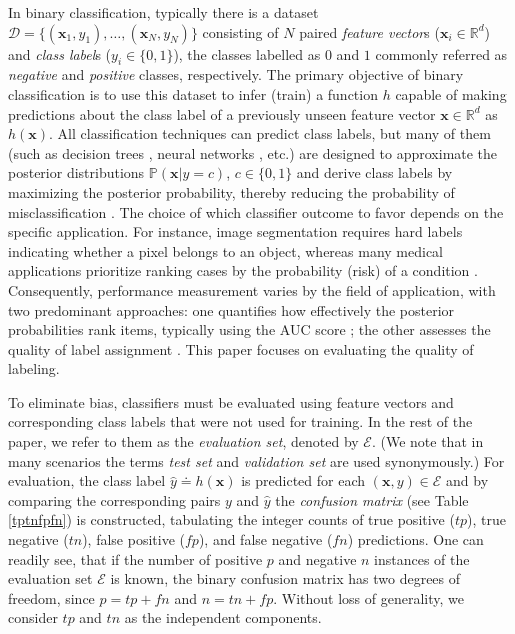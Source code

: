 \documentclass[3p, times]{elsarticle}
\begin{document}
In binary classification, typically there is a dataset $\mathcal{D} = \lbrace(\mathbf{x}_1, y_1), \dots, (\mathbf{x}_N, y_N)\rbrace$ consisting of $N$ paired \emph{feature vector}s ($\mathbf{x}_i\in\mathbb{R}^{d}$) and \emph{class label}s ($y_i\in\lbrace 0, 1\rbrace$), the classes labelled as $0$ and $1$ commonly referred as \emph{negative} and \emph{positive} classes, respectively.
The primary objective of binary classification is to use this dataset to infer (train) a function $h$ capable of making predictions about the class label of a previously unseen feature vector $\mathbf{x}\in\mathbb{R}^d$ as $h(\mathbf{x})$. All classification techniques can predict class labels, but many of them (such as decision trees \cite{mlbook}, neural networks \cite{mlbook}, etc.) are designed to approximate the posterior distributions $\mathbb{P}(\mathbf{x}|y=c)$, $c\in\lbrace 0, 1\rbrace$ and derive class labels by maximizing the posterior probability, thereby reducing the probability of misclassification \cite{bayesclassifier}. The choice of which classifier outcome to favor depends on the specific application. For instance, image segmentation \cite{segmentation} requires hard labels indicating whether a pixel belongs to an object, whereas many medical applications prioritize ranking cases by the probability (risk) of a condition \cite{binclasranking}. Consequently, performance measurement varies by the field of application, with two predominant approaches: one quantifies how effectively the posterior probabilities rank items, typically using the AUC score \cite{aucsurvey, auc}; the other assesses the quality of label assignment \cite{scores}. This paper focuses on evaluating the quality of labeling.

To eliminate bias, classifiers must be evaluated using feature vectors and corresponding class labels that were not used for training. In the rest of the paper, we refer to them as the \emph{evaluation set}, denoted by $\mathcal{E}$. (We note that in many scenarios the terms \emph{test set} and \emph{validation set} are used synonymously.) For evaluation, the class label $\hat{y} \doteq h(\mathbf{x})$ is predicted for each $(\mathbf{x}, y)\in\mathcal{E}$ and by comparing the corresponding pairs $y$ and $\hat{y}$ the \emph{confusion matrix} (see Table \ref{tptnfpfn}) is constructed, tabulating the integer counts of true positive ($tp$), true negative ($tn$), false positive ($fp$), and false negative ($fn$) predictions. 
One can readily see, that if the number of positive $p$ and negative $n$ instances of the evaluation set $\mathcal{E}$ is known, the binary confusion matrix has two degrees of freedom, since $p = tp + fn$ and $n = tn + fp$. Without loss of generality, we consider $tp$ and $tn$ as the independent components.
\end{document}
